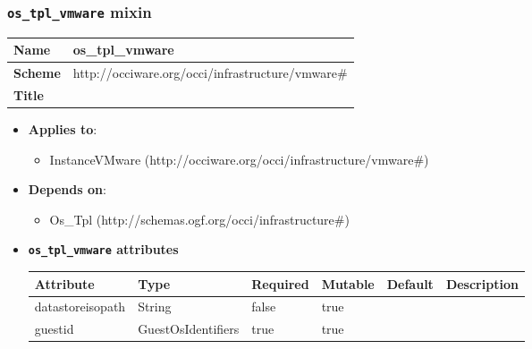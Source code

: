  
\subsubsection{\texttt{os\_tpl_vmware} mixin}
\begin{center}
\begin{tabular}{|l|l|}
  \hline
  \textbf{Name} & os\_tpl_vmware \\
  \hline  
  \textbf{Scheme} & http://occiware.org/occi/infrastructure/vmware\# \\
  \hline
  \textbf{Title} &  \\
  \hline
\end{tabular}
\end{center}
\begin{itemize}
\item \textbf{Applies to}:
\begin{itemize}
	\item InstanceVMware (http://occiware.org/occi/infrastructure/vmware\#)
\end{itemize}
\end{itemize} 
\begin{itemize}
\item \textbf{Depends on}:
\begin{itemize}
	\item Os\_Tpl (http://schemas.ogf.org/occi/infrastructure\#)
\end{itemize}
\end{itemize}

\begin{itemize}
\item \textbf{\texttt{os\_tpl_vmware} attributes}

\begin{tabularx}{\textwidth}{|l|l|p{1.4cm}|p{1.3cm}|l|X|}
  \hline
  \textbf{Attribute} & \textbf{Type} & \textbf{Required} & \textbf{Mutable} & \textbf{Default} & \textbf{Description} \\
  \hline  
  datastoreisopath & String & false & true &  &  \\
  \hline
  guestid & GuestOsIdentifiers & true & true &  &  \\
  \hline
\end{tabularx}
\end{itemize}


 
